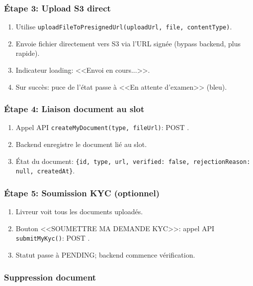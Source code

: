 \subsubsection{Étape 3: Upload S3 direct}

\begin{enumerate}
    \item Utilise \texttt{uploadFileToPresignedUrl(uploadUrl, file, contentType)}.
    \item Envoie fichier directement vers S3 via l'URL signée (bypass backend, plus rapide).
    \item Indicateur loading: <<Envoi en cours...>>.
    \item Sur succès: puce de l'état passe à <<En attente d'examen>> (bleu).
\end{enumerate}

\subsubsection{Étape 4: Liaison document au slot}

\begin{enumerate}
    \item Appel API \texttt{createMyDocument(type, fileUrl)}: POST .
    \item Backend enregistre le document lié au slot.
    \item État du document: \texttt{\{id, type, url, verified: false, rejectionReason: null, createdAt\}}.
\end{enumerate}

\subsubsection{Étape 5: Soumission KYC (optionnel)}

\begin{enumerate}
    \item Livreur voit tous les documents uploadés.
    \item Bouton <<SOUMETTRE MA DEMANDE KYC>>: appel API \texttt{submitMyKyc()}: POST .
    \item Statut passe à PENDING; backend commence vérification.
\end{enumerate}

\subsubsection{Suppression document}

